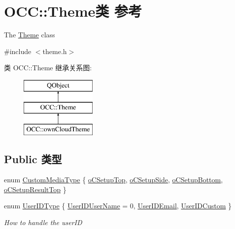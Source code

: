 \hypertarget{class_o_c_c_1_1_theme}{}\section{O\+CC\+:\+:Theme类 参考}
\label{class_o_c_c_1_1_theme}


The \hyperlink{class_o_c_c_1_1_theme}{Theme} class  




{\ttfamily \#include $<$theme.\+h$>$}

类 O\+CC\+:\+:Theme 继承关系图\+:\begin{figure}[H]
\begin{center}
\leavevmode
\includegraphics[height=3.000000cm]{class_o_c_c_1_1_theme}
\end{center}
\end{figure}
\subsection*{Public 类型}
\begin{DoxyCompactItemize}
\item 
enum \hyperlink{class_o_c_c_1_1_theme_a7d36668d1fd0d715e4e1d8f4590d2d5d}{Custom\+Media\+Type} \{ \hyperlink{class_o_c_c_1_1_theme_a7d36668d1fd0d715e4e1d8f4590d2d5da99097a6336fd37e087f1bea7205173ae}{o\+C\+Setup\+Top}, 
\hyperlink{class_o_c_c_1_1_theme_a7d36668d1fd0d715e4e1d8f4590d2d5da400336cadb940698bd45ca4700c66ca6}{o\+C\+Setup\+Side}, 
\hyperlink{class_o_c_c_1_1_theme_a7d36668d1fd0d715e4e1d8f4590d2d5dafccadf84cb009020405ab81371448930}{o\+C\+Setup\+Bottom}, 
\hyperlink{class_o_c_c_1_1_theme_a7d36668d1fd0d715e4e1d8f4590d2d5dae77a20772197e658842b85b1a68005de}{o\+C\+Setup\+Result\+Top}
 \}
\item 
enum \hyperlink{class_o_c_c_1_1_theme_a134c3c8a839c3cb454b73e8c28f2e6ce}{User\+I\+D\+Type} \{ \hyperlink{class_o_c_c_1_1_theme_a134c3c8a839c3cb454b73e8c28f2e6cea6e0368d07ae4c6dde758d44b357c30f8}{User\+I\+D\+User\+Name} = 0, 
\hyperlink{class_o_c_c_1_1_theme_a134c3c8a839c3cb454b73e8c28f2e6ceae402fcc07cd289e69f7daa2811894ffe}{User\+I\+D\+Email}, 
\hyperlink{class_o_c_c_1_1_theme_a134c3c8a839c3cb454b73e8c28f2e6ceaf81a138f42863ec0d8d3559b49d92857}{User\+I\+D\+Custom}
 \}\begin{DoxyCompactList}\small\item\em How to handle the user\+ID \end{DoxyCompactList}
\end{DoxyCompactItemize}
